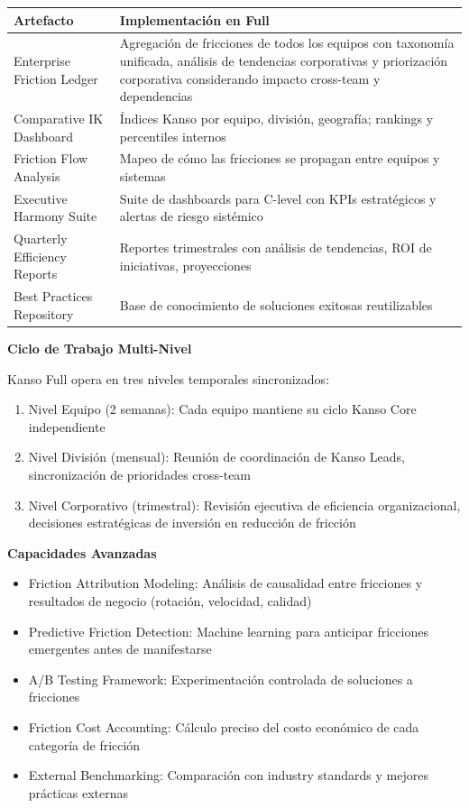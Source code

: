 \begin{center}
\small
\begin{tabular}{|p{4cm}|p{9cm}|}
\hline
\textbf{Artefacto} & \textbf{Implementación en Full} \\ \hline
Enterprise Friction Ledger & Agregación de fricciones de todos los equipos con taxonomía unificada, análisis de tendencias corporativas y priorización corporativa considerando impacto cross-team y dependencias \\ \hline
Comparative IK Dashboard & Índices Kanso por equipo, división, geografía; rankings y percentiles internos \\ \hline
Friction Flow Analysis & Mapeo de cómo las fricciones se propagan entre equipos y sistemas \\ \hline
Executive Harmony Suite & Suite de dashboards para C-level con KPIs estratégicos y alertas de riesgo sistémico \\ \hline
Quarterly Efficiency Reports & Reportes trimestrales con análisis de tendencias, ROI de iniciativas, proyecciones \\ \hline
Best Practices Repository & Base de conocimiento de soluciones exitosas reutilizables \\ \hline
\end{tabular}
\end{center}

\textbf{Ciclo de Trabajo Multi-Nivel}

Kanso Full opera en tres niveles temporales sincronizados:

\begin{enumerate}
    \item Nivel Equipo (2 semanas): Cada equipo mantiene su ciclo Kanso Core independiente
    \item Nivel División (mensual): Reunión de coordinación de Kanso Leads, sincronización de prioridades cross-team
    \item Nivel Corporativo (trimestral): Revisión ejecutiva de eficiencia organizacional, decisiones estratégicas de inversión en reducción de fricción
\end{enumerate}

\textbf{Capacidades Avanzadas}

\begin{itemize}
    \item Friction Attribution Modeling: Análisis de causalidad entre fricciones y resultados de negocio (rotación, velocidad, calidad)
    \item Predictive Friction Detection: Machine learning para anticipar fricciones emergentes antes de manifestarse
    \item A/B Testing Framework: Experimentación controlada de soluciones a fricciones
    \item Friction Cost Accounting: Cálculo preciso del costo económico de cada categoría de fricción
    \item External Benchmarking: Comparación con industry standards y mejores prácticas externas
\end{itemize}


